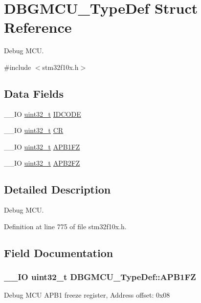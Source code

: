 \hypertarget{struct_d_b_g_m_c_u___type_def}{\section{D\-B\-G\-M\-C\-U\-\_\-\-Type\-Def Struct Reference}
\label{struct_d_b_g_m_c_u___type_def}
}


Debug M\-C\-U.  




{\ttfamily \#include $<$stm32f10x.\-h$>$}

\subsection*{Data Fields}
\begin{DoxyCompactItemize}
\item 
\-\_\-\-\_\-\-I\-O \hyperlink{stdint_8h_a435d1572bf3f880d55459d9805097f62}{uint32\-\_\-t} \hyperlink{struct_d_b_g_m_c_u___type_def_a0cc3561c124d06bb57dfa855e43ed99f}{I\-D\-C\-O\-D\-E}
\item 
\-\_\-\-\_\-\-I\-O \hyperlink{stdint_8h_a435d1572bf3f880d55459d9805097f62}{uint32\-\_\-t} \hyperlink{struct_d_b_g_m_c_u___type_def_a15981828f2b915d38570cf6684e99a53}{C\-R}
\item 
\-\_\-\-\_\-\-I\-O \hyperlink{stdint_8h_a435d1572bf3f880d55459d9805097f62}{uint32\-\_\-t} \hyperlink{struct_d_b_g_m_c_u___type_def_aac341c7e09cd5224327eeb7d9f122bed}{A\-P\-B1\-F\-Z}
\item 
\-\_\-\-\_\-\-I\-O \hyperlink{stdint_8h_a435d1572bf3f880d55459d9805097f62}{uint32\-\_\-t} \hyperlink{struct_d_b_g_m_c_u___type_def_a011f892d86367dbe786964b14bc515a6}{A\-P\-B2\-F\-Z}
\end{DoxyCompactItemize}


\subsection{Detailed Description}
Debug M\-C\-U. 

Definition at line 775 of file stm32f10x.\-h.



\subsection{Field Documentation}
\hypertarget{struct_d_b_g_m_c_u___type_def_aac341c7e09cd5224327eeb7d9f122bed}{
\subsubsection[{A\-P\-B1\-F\-Z}]{\setlength{\rightskip}{0pt plus 5cm}\-\_\-\-\_\-\-I\-O {\bf uint32\-\_\-t} D\-B\-G\-M\-C\-U\-\_\-\-Type\-Def\-::\-A\-P\-B1\-F\-Z}}\label{struct_d_b_g_m_c_u___type_def_aac341c7e09cd5224327eeb7d9f122bed}
Debug M\-C\-U A\-P\-B1 freeze register, Address offset\-: 0x08 


